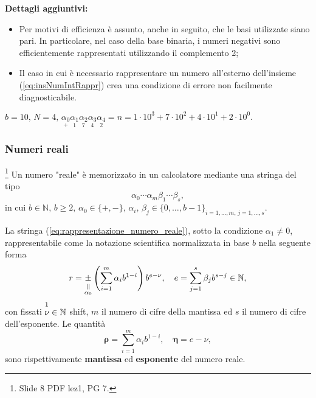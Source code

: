 \textbf{Dettagli aggiuntivi:}
\begin{itemize}
	\item Per motivi di efficienza è assunto, anche in seguito, che le basi utilizzate siano pari. In particolare, nel caso della base binaria, i numeri negativi sono efficientemente rappresentati utilizzando il complemento 2;
	\item Il caso in cui è necessario rappresentare un numero all'esterno dell'insieme (\ref{eq:insNumIntRappr}) crea una condizione di errore non facilmente diagnosticabile. 
\end{itemize}

\begin{example}
	$b=10,\, N=4,\, \underset{+}{\alpha_0}\underset{1}{\alpha_1}\underset{7}{\alpha_2}\underset{4}{\alpha_3}\underset{2}{\alpha_4}=n=1\cdot 10^3+7\cdot 10^2+4\cdot 10^1+2\cdot 10^0.$
\end{example}

\subsubsection{Numeri reali}\footnote{Slide 8 PDF lez1, PG 7.}
Un numero "reale" è memorizzato in un calcolatore mediante una stringa del tipo
\begin{equation}\label{eq:rappresentazione_numero_reale}
	\alpha_0\cdots\alpha_m\beta_1\cdots\beta_s,
\end{equation}
in cui $b\in\mathbb N,\, b\geq 2,\, \alpha_0\in\{+,-\},\, \alpha_i,\,\beta_j\in\{0,\hdots,b-1\}_{i=1,\hdots,m,\, j=1,\hdots,s}.$
\begin{definition}
	La stringa (\ref{eq:rappresentazione_numero_reale}), sotto la condizione $\alpha_1\neq 0$, rappresentabile come la notazione scientifica normalizzata in base $b$ nella seguente forma
	\begin{equation}\label{eq:rappresentazione_scientifica_normalizzata}
		r=\equalto{\pm}{\alpha_0}\left(\sum_{i=1}^m\alpha_ib^{1-i}\right)b^{e-\nu},\quad e=\sum_{j=1}^s\beta_jb^{s-j}\in\mathbb N,
	\end{equation}
	con fissati $\overset{\footnotemark}{\nu}\in\mathbb N$ shift, $m$ il numero di cifre della mantissa ed $s$ il numero di cifre dell'esponente. Le quantità
	\begin{equation}\label{eq:mantissa_esponente_rappresentazione_numero_reale}
		\boldsymbol\rho = \sum_{i=1}^m\alpha_ib^{1-i},\quad \boldsymbol\eta = e-\nu,
	\end{equation}
	sono rispettivamente \textbf{mantissa} ed \textbf{esponente} del numero reale.
\end{definition}

